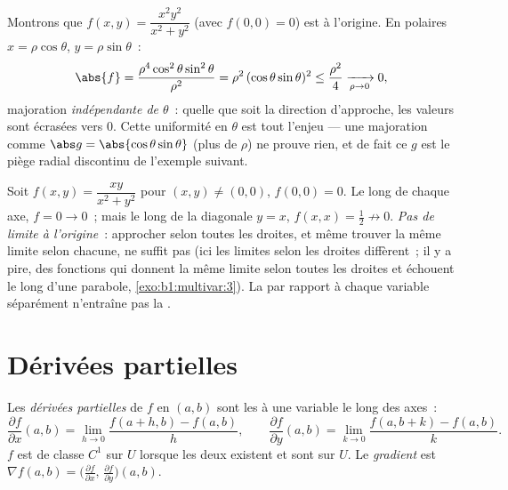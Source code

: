 \begin{example}
\label{ex:b1:multivar:polarbound}
Montrons que $f(x, y) = \dfrac{x^2y^2}{x^2 + y^2}$ (avec $f(0,0) =
0$) est  à l'origine. En  polaires $x =
\rho\cos\theta$, $y = \rho\sin\theta$~:
\[
\abs{f} = \frac{\rho^4\cos^2\theta\sin^2\theta}{\rho^2}
= \rho^2\,(\cos\theta\sin\theta)^2 \leq \frac{\rho^2}{4}
\xrightarrow[\rho \to 0]{} 0 ,
\]
majoration \emph{indépendante de $\theta$}~: quelle que soit la
direction d'approche, les valeurs sont écrasées vers $0$. Cette
uniformité en $\theta$ est tout l'enjeu --- une majoration comme
$\abs g = \abs{\cos\theta\sin\theta}$ (plus de $\rho$) ne prouve
rien, et de fait ce $g$ est le piège radial discontinu de
l'exemple suivant.
\end{example}

\begin{example}\label{ex:b1:multivar:trap}
Soit $f(x, y) = \dfrac{xy}{x^2 + y^2}$ pour $(x,y) \neq (0,0)$,
$f(0, 0) = 0$. Le long de chaque axe, $f = 0 \to 0$~; mais le long
de la diagonale $y = x$, $f(x, x) = \frac12 \not\to 0$. \emph{Pas
de limite à l'origine}~: approcher selon toutes les droites, et
même trouver la même limite selon chacune, ne suffit pas (ici les
limites selon les droites diffèrent~; il y a pire, des fonctions
qui donnent la même limite selon toutes les droites et échouent le
long d'une parabole, \cref{exo:b1:multivar:3}). La  par
rapport à chaque variable séparément n'entraîne pas la .
\end{example}

\section{Dérivées partielles}

\begin{definition}\label{def:b1:multivar:partial}
Les \emph{dérivées partielles} de $f$ en
$(a, b)$ sont les  à une variable le long des axes~:
\[
\frac{\partial f}{\partial x}(a,b)
= \lim_{h \to 0} \frac{f(a + h, b) - f(a,b)}{h},
\qquad
\frac{\partial f}{\partial y}(a,b)
= \lim_{k \to 0} \frac{f(a, b + k) - f(a,b)}{k}.
\]
$f$ est de classe $C^1$ sur $U$ lorsque les deux existent et sont
 sur $U$. Le \emph{gradient} est $\nabla
f(a,b) = \bigl(\frac{\partial f}{\partial x},\, \frac{\partial
f}{\partial y}\bigr)(a,b)$.
\end{definition}

